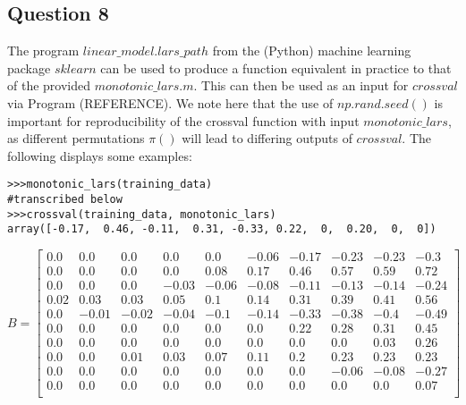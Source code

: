\documentclass{article}
\begin{document}
\vspace{-0.5cm}
\subsection{Question 8}
\vspace{-0.3cm}

The program $linear\_model.lars\_path$ from the (Python) machine learning package $sklearn$ can be used to produce a function equivalent in practice to that of the provided $monotonic\_lars.m$. This can then be used as an input for $crossval$ via Program (REFERENCE). We note here that the use of $np.rand.seed()$ is important for reproducibility of the crossval function with input $monotonic\_lars$, as different permutations $\pi()$ will lead to differing outputs of $crossval$. The following displays some examples:

\begin{lstlisting}
>>>monotonic_lars(training_data)
#transcribed below
>>>crossval(training_data, monotonic_lars)
array([-0.17,  0.46, -0.11,  0.31, -0.33, 0.22,  0,  0.20,  0,  0])
\end{lstlisting}

\begin{equation*}
B=
\begin{bmatrix}
0.0 & 0.0 & 0.0 & 0.0 & 0.0 & -0.06 & -0.17 & -0.23 & -0.23 & -0.3 \\
0.0 & 0.0 & 0.0 & 0.0 & 0.08 & 0.17 & 0.46 & 0.57 & 0.59 & 0.72 \\
0.0 & 0.0 & 0.0 & -0.03 & -0.06 & -0.08 & -0.11 & -0.13 & -0.14 & -0.24 \\
0.02 & 0.03 & 0.03 & 0.05 & 0.1 & 0.14 & 0.31 & 0.39 & 0.41 & 0.56 \\
0.0 & -0.01 & -0.02 & -0.04 & -0.1 & -0.14 & -0.33 & -0.38 & -0.4 & -0.49 \\
0.0 & 0.0 & 0.0 & 0.0 & 0.0 & 0.0 & 0.22 & 0.28 & 0.31 & 0.45 \\
0.0 & 0.0 & 0.0 & 0.0 & 0.0 & 0.0 & 0.0 & 0.0 & 0.03 & 0.26 \\
0.0 & 0.0 & 0.01 & 0.03 & 0.07 & 0.11 & 0.2 & 0.23 & 0.23 & 0.23 \\
0.0 & 0.0 & 0.0 & 0.0 & 0.0 & 0.0 & 0.0 & -0.06 & -0.08 & -0.27 \\
0.0 & 0.0 & 0.0 & 0.0 & 0.0 & 0.0 & 0.0 & 0.0 & 0.0 & 0.07 \\
\end{bmatrix}
\end{equation*}
\end{document}
